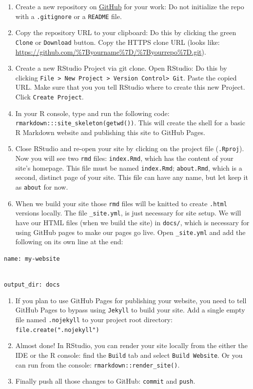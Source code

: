 \documentclass[
]{book}
\providecommand{\tightlist}{%
  \setlength{\itemsep}{0pt}\setlength{\parskip}{0pt}}
\begin{document}
\begin{enumerate}
\def\labelenumi{\arabic{enumi}.}
\tightlist
\item
  Create a new repository on \href{https://github.com}{GitHub} for your work: Do not initialize the repo with a \texttt{.gitignore} or a \texttt{README} file.
\item
  Copy the repository URL to your clipboard: Do this by clicking the green \texttt{Clone} or \texttt{Download} button. Copy the HTTPS clone URL (looks like: \url{https://github.com/\%7Byourname\%7D/\%7Byourrepo\%7D.git}).
\item
  Create a new RStudio Project via git clone. Open RStudio: Do this by clicking \texttt{File\ \textgreater{}\ New\ Project\ \textgreater{}\ Version\ Control\textgreater{}\ Git}. Paste the copied URL. Make sure that you you tell RStudio where to create this new Project. Click \texttt{Create\ Project}.
\item
  In your R console, type and run the following code: \texttt{rmarkdown:::site\_skeleton(getwd())}. This will create the shell for a basic R Markdown website and publishing this site to GitHub Pages.
\item
  Close RStudio and re-open your site by clicking on the project file (\texttt{.Rproj}). Now you will see two \texttt{rmd} files: \texttt{index.Rmd}, which has the content of your site's homepage. This file must be named \texttt{index.Rmd}; \texttt{about.Rmd}, which is a second, distinct page of your site. This file can have any name, but let keep it as \texttt{about} for now.
\item
  When we build your site those \texttt{rmd} files will be knitted to create \texttt{.html} versions locally. The file \texttt{\_site.yml}, is just necessary for site setup. We will have our HTML files (when we build the site) in \texttt{docs/}, which is necessary for using GitHub pages to make our pages go live. Open \texttt{\_site.yml} and add the following on its own line at the end:
\end{enumerate}

\texttt{name:\ my-website}\strut \\
\texttt{output\_dir:\ docs}

\begin{enumerate}
\def\labelenumi{\arabic{enumi}.}
\setcounter{enumi}{6}
\tightlist
\item
  If you plan to use GitHub Pages for publishing your website, you need to tell GitHub Pages to bypass using \texttt{Jekyll} to build your site. Add a single empty file named \texttt{.nojekyll} to your project root directory: \texttt{file.create(".nojekyll")}
\item
  Almost done! In RStudio, you can render your site locally from the either the IDE or the R console: find the \texttt{Build} tab and select \texttt{Build\ Website}. Or you can run from the console: \texttt{rmarkdown::render\_site()}.
\item
  Finally push all those changes to GitHub: \texttt{commit} and \texttt{push}.
\end{enumerate}
\end{document}
